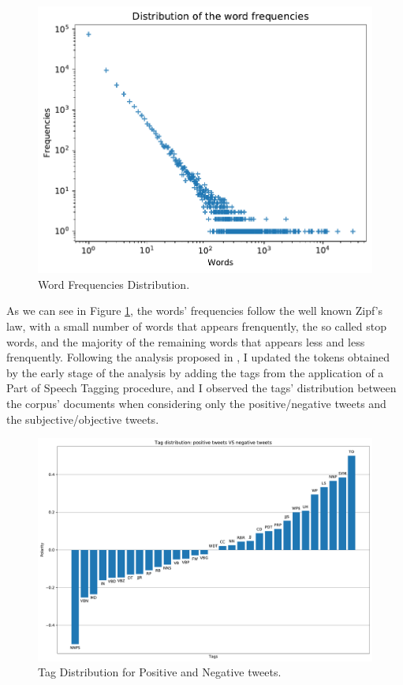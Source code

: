 \documentclass[11pt,twocolumn]{article}
\begin{document}
        \begin{figure}[h]
            \centering
            \includegraphics[width=\linewidth]{../images/word_frequencies.pdf}
            \caption{Word Frequencies Distribution.}
            \label{fig:word_frequencies}
        \end{figure}

        \noindent
        As we can see in Figure \ref{fig:word_frequencies}, the words' frequencies follow the well known
        Zipf's law, with a small number of words that appears frenquently, the so called stop words, and the
        majority of the remaining words that appears less and less frenquently. Following the analysis
        proposed in \cite{twitter_as_a_corpus}, I updated the tokens obtained by the early stage of the
        analysis by adding the tags from the application of a Part of Speech Tagging procedure, and I
        observed the tags' distribution between the corpus' documents when considering only the
        positive/negative tweets and the subjective/objective tweets.

        \begin{figure}[h]
            \centering
            \includegraphics[width=\linewidth]{../images/tag_distribution_positive_vs_negative.pdf}
            \caption{Tag Distribution for Positive and Negative tweets.}
            \label{fig:tags_pos_vs_neg}
        \end{figure}
\end{document}
